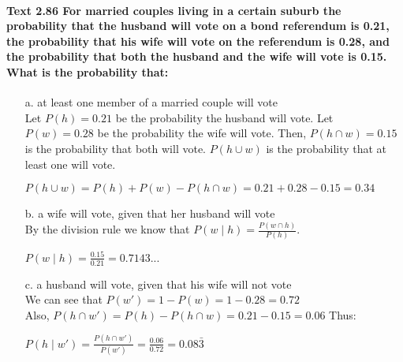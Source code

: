 \documentclass{article}
\begin{document}
\paragraph{Text 2.86 For married couples living in a certain suburb the 
probability that the husband will vote on a bond referendum is 0.21, the 
probability that his wife will vote on the referendum is 0.28, and the 
probability that both the husband and the wife will vote is 0.15. What is the 
probability that:\\}
\begin{enumerate}
\item[a.] at least one member of a married couple will vote\\
Let $P(h)=0.21$ be the probability the husband will vote. Let $P(w)=0.28$ be the
probability the wife will vote. Then, $P(h \cap w) = 0.15$ is the probability 
that both will vote. $P(h \cup w)$ is the probability that at least one will vote. 
\begin{center}
$\boxed{P(h \cup w) = P(h) + P(w) - P(h \cap w) = 0.21+0.28-0.15 = 0.34}$
\end{center}

\item[b.] a wife will vote, given that her husband will vote\\
By the division rule we know that $P(w\mid h) = \frac{P(w \cap h)}{P(h)}$.
\begin{center}
$\boxed{P(w\mid h) = \frac{0.15}{0.21} = 0.7143...}$
\end{center}

\item[c.] a husband will vote, given that his wife will not vote\\
We can see that $P(w') = 1-P(w) = 1-0.28 = 0.72$\\
Also, $P(h \cap w') = P(h) - P(h \cap w) = 0.21 - 0.15 = 0.06$
Thus:
\begin{center}
$\boxed{P(h\mid w') = \frac{P(h \cap w')}{P(w')} = \frac{0.06}{0.72} = 0.08\bar3}$
\end{center}
\end{enumerate}
\end{document}
